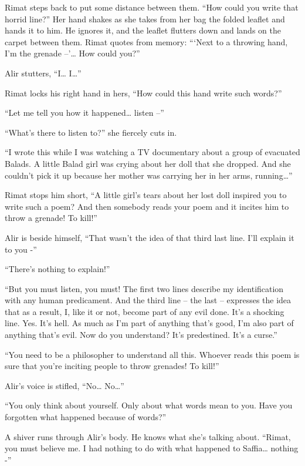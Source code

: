 \documentclass[twoside,11pt]{book}
\begin{document}
Rimat steps back to put some distance between them. ``How could you write that horrid line?''
Her hand shakes as she takes from her bag the folded leaflet and hands it to him. He ignores it, and the leaflet
flutters down and lands on the carpet between them. Rimat quotes from memory: ```Next to a throwing hand,
I'm the grenade --'{\dots} How could you?''

Alir stutters, ``I{\dots} I{\dots}''

Rimat locks his right hand in hers, ``How could this hand write such words?''

``Let me tell you how it happened{\dots} listen --''

``What's there to listen to?'' she fiercely cuts in.

``I wrote this while I was watching a TV documentary about a group of evacuated Balads. A little Balad girl
was crying about her doll that she dropped. And she couldn't pick it up because her mother was carrying her in her
arms, running{\dots}''

Rimat stops him short, ``A little girl's tears about her lost doll inspired you to write such a poem?  And
then somebody reads your poem and it incites him to throw a grenade! To kill!''

Alir is beside himself, ``That wasn't the idea of that third last line. I'll explain it to you
-''

``There's nothing to explain!''

``But you must listen, you must! The first two lines describe my identification with any human predicament.
And the third line -- the last -- expresses the idea that as a result, I, like it or not, become part of any evil
done. It's a shocking line. Yes. It's hell. As much as I'm part of anything that's good, I'm also part of anything
that's evil. Now do you understand? It's predestined. It's a curse.''

``You need to be a philosopher to understand all this. Whoever reads this poem is sure that you're inciting
people to throw grenades! To kill!''

Alir's voice is stifled, ``No{\dots} No{\dots}''

``You only think about yourself. Only about what words mean to you. Have you forgotten what happened
because of words?''

A shiver runs through Alir's body. He knows what she's talking about. ``Rimat, you must believe me. I had
nothing to do with what happened to Saffia{\ldots} nothing -''
\end{document}
